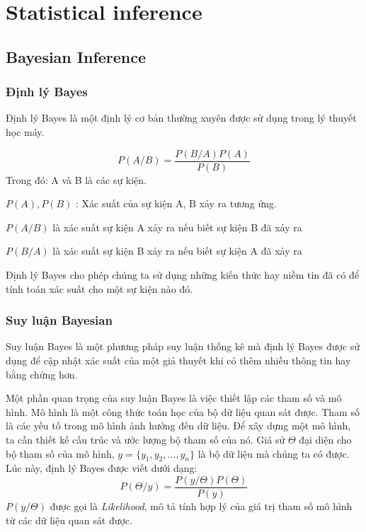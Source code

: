 


\chapter{Statistical inference}

\pagebreak

\section{Bayesian Inference}
\subsection{Định lý Bayes}
Định lý Bayes là một định lý cơ bản thường xuyên được sử dụng trong lý thuyết học máy.

\begin{equation}
	P(A/B) = \frac{P(B/A)P(A)}{P(B)}
\end{equation}
Trong đó: 
A và B là các sự kiện.

$P(A), P(B)$ : Xác suất của sự kiện A, B xảy ra tương ứng.

$P(A/B)$ là xác suất sự kiện A xảy ra nếu biết sự kiện B đã xảy ra

$P(B/A)$ là xác suất sự kiện B xảy ra nếu biết sự kiện A đã xảy ra

Định lý Bayes cho phép chúng ta sử dụng những kiến thức hay niềm tin đã có để tính toán xác suất cho một sự kiện nào đó.
\subsection{Suy luận Bayesian}
Suy luận Bayes là một phương pháp suy luận thống kê mà định lý Bayes được sử dụng để cập nhật xác suất của một giả thuyết khi có thêm nhiều thông tin hay bằng chứng hơn. 

Một phần quan trọng của suy luận Bayes là việc thiết lập các tham số và mô hình. Mô hình là một công thức toán học của bộ dữ liệu quan sát được. Tham số là các yếu tố trong mô hình ảnh hưởng đến dữ liệu.
Để xây dựng một mô hình, ta cần thiết kế cấu trúc và ước lượng bộ tham số của nó.
Giá sử $\Theta$ đại diện cho bộ tham số của mô hình, $y = \{y_1, y_2, \dots, y_n \}$ là bộ dữ liệu mà chúng ta có được. Lúc này, định lý Bayes được viết dưới dạng:
\begin{equation}
P(\Theta/y) = \frac{P(y/\Theta)P(\Theta)}{P(y)}
\end{equation}
$P(y/\Theta)$ được gọi là \textit{Likelihood}, mô tả tính hợp lý của giá trị tham số mô hình từ các dữ liệu quan sát được.

